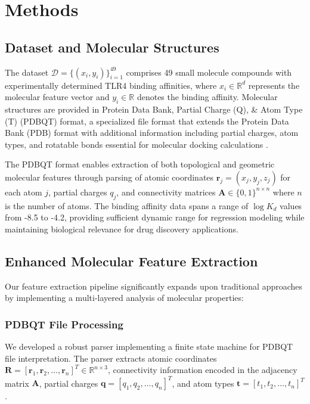 \documentclass[preprint, 10pt]{elsarticle}
\begin{document}
\section{Methods}

\subsection{Dataset and Molecular Structures}

The dataset $\mathcal{D} = \{(x_i, y_i)\}_{i=1}^{49}$ comprises 49 small molecule compounds with experimentally determined TLR4 binding affinities, where $x_i \in \mathbb{R}^d$ represents the molecular feature vector and $y_i \in \mathbb{R}$ denotes the binding affinity. Molecular structures are provided in Protein Data Bank, Partial Charge (Q), \& Atom Type (T) (PDBQT) format, a specialized file format that extends the Protein Data Bank (PDB) format with additional information including partial charges, atom types, and rotatable bonds essential for molecular docking calculations \cite{morris2009autodock4}.

The PDBQT format enables extraction of both topological and geometric molecular features through parsing of atomic coordinates $\mathbf{r}_j = (x_j, y_j, z_j)$ for each atom $j$, partial charges $q_j$, and connectivity matrices $\mathbf{A} \in \{0,1\}^{n \times n}$ where $n$ is the number of atoms. The binding affinity data spans a range of $\log K_d$ values from -8.5 to -4.2, providing sufficient dynamic range for regression modeling while maintaining biological relevance for drug discovery applications.

\subsection{Enhanced Molecular Feature Extraction}

Our feature extraction pipeline significantly expands upon traditional approaches by implementing a multi-layered analysis of molecular properties:

\subsubsection{PDBQT File Processing}
We developed a robust parser implementing a finite state machine for PDBQT file interpretation. The parser extracts atomic coordinates $\mathbf{R} = [\mathbf{r}_1, \mathbf{r}_2, \ldots, \mathbf{r}_n]^T \in \mathbb{R}^{n \times 3}$, connectivity information encoded in the adjacency matrix $\mathbf{A}$, partial charges $\mathbf{q} = [q_1, q_2, \ldots, q_n]^T$, and atom types $\mathbf{t} = [t_1, t_2, \ldots, t_n]^T$. 
\end{document}
